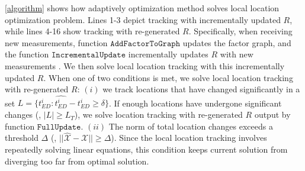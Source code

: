 
\alg \ref{algorithm} shows how adaptively optimization method solves local location optimization problem.
Lines 1-3 depict tracking with incrementally updated $R$, while lines 4-16 show tracking with re-generated $R$. 
Specifically, when receiving new measurements, function $\mathtt{AddFactorToGraph}$ updates the factor graph, and the function $\mathtt{IncrementalUpdate}$ incrementally updates $R$ with new measurements \cite{kaess2012isam2}. 
We then solve local location tracking with this incrementally updated $R$.
When one of two conditions is met, we solve local location tracking with re-generated $R$: 
$(i)$ we track locations that have changed significantly in a set $L = \{t_{ED}^i: \hat{t^i_{ED}} - t^i_{ED} \geq \delta\}$. If enough locations have undergone significant changes (\ie, $|L| \geq L_T$), we solve location tracking with re-generated $R$ output by function $\mathtt{FullUpdate}$.
$(ii)$ The norm of total location changes exceeds a threshold $\Delta$ (\ie, $||\hat{\mathcal{X}} - \mathcal{X} || \geq \Delta$).
Since the local location tracking involves repeatedly solving linear equations, this condition keeps current solution from diverging too far from optimal solution.

